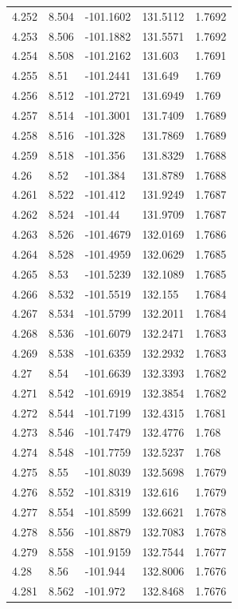 \begin{tabular}{lllll}
4.252 & 8.504 & -101.1602 & 131.5112 & 1.7692 \\
4.253 & 8.506 & -101.1882 & 131.5571 & 1.7692 \\
4.254 & 8.508 & -101.2162 & 131.603 & 1.7691 \\
4.255 & 8.51 & -101.2441 & 131.649 & 1.769 \\
4.256 & 8.512 & -101.2721 & 131.6949 & 1.769 \\
4.257 & 8.514 & -101.3001 & 131.7409 & 1.7689 \\
4.258 & 8.516 & -101.328 & 131.7869 & 1.7689 \\
4.259 & 8.518 & -101.356 & 131.8329 & 1.7688 \\
4.26 & 8.52 & -101.384 & 131.8789 & 1.7688 \\
4.261 & 8.522 & -101.412 & 131.9249 & 1.7687 \\
4.262 & 8.524 & -101.44 & 131.9709 & 1.7687 \\
4.263 & 8.526 & -101.4679 & 132.0169 & 1.7686 \\
4.264 & 8.528 & -101.4959 & 132.0629 & 1.7685 \\
4.265 & 8.53 & -101.5239 & 132.1089 & 1.7685 \\
4.266 & 8.532 & -101.5519 & 132.155 & 1.7684 \\
4.267 & 8.534 & -101.5799 & 132.2011 & 1.7684 \\
4.268 & 8.536 & -101.6079 & 132.2471 & 1.7683 \\
4.269 & 8.538 & -101.6359 & 132.2932 & 1.7683 \\
4.27 & 8.54 & -101.6639 & 132.3393 & 1.7682 \\
4.271 & 8.542 & -101.6919 & 132.3854 & 1.7682 \\
4.272 & 8.544 & -101.7199 & 132.4315 & 1.7681 \\
4.273 & 8.546 & -101.7479 & 132.4776 & 1.768 \\
4.274 & 8.548 & -101.7759 & 132.5237 & 1.768 \\
4.275 & 8.55 & -101.8039 & 132.5698 & 1.7679 \\
4.276 & 8.552 & -101.8319 & 132.616 & 1.7679 \\
4.277 & 8.554 & -101.8599 & 132.6621 & 1.7678 \\
4.278 & 8.556 & -101.8879 & 132.7083 & 1.7678 \\
4.279 & 8.558 & -101.9159 & 132.7544 & 1.7677 \\
4.28 & 8.56 & -101.944 & 132.8006 & 1.7676 \\
4.281 & 8.562 & -101.972 & 132.8468 & 1.7676 \\

\end{tabular}
